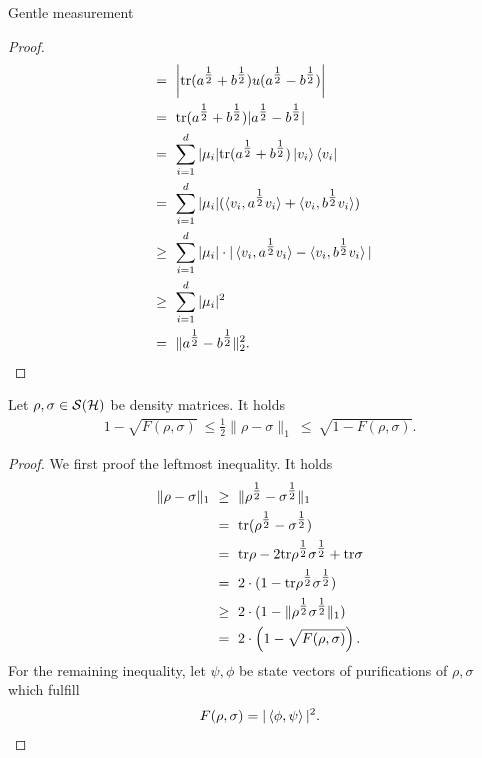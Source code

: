 \begin{subsubsection}{Gentle measurement}
\begin{proof}
\begin{align}
       \ & = \ \left|\mathrm{tr}(a^{\tfrac{1}{2}} + b^{\tfrac{1}{2}})u(a^{\tfrac{1}{2}} - b^{\tfrac{1}{2}}) \right| \\
       \ & = \ \mathrm{tr}(a^{\tfrac{1}{2}} + b^{\tfrac{1}{2}})|a^{\tfrac{1}{2}} - b^{\tfrac{1}{2}}|  \\
       \ & = \ \sum_{i=1}^d |\mu_i| \mathrm{tr} (a^{\tfrac{1}{2}} + b^{\tfrac{1}{2}})\ket{v_i}\bra{v_i} \\
       \ & = \ \sum_{i=1}^d |\mu_i|(\braket{v_i, a^{\tfrac{1}{2}} v_i}  + \braket{v_i, b^{\tfrac{1}{2}} v_i}) \\
       \ & \geq \ \sum_{i=1}^d |\mu_i| \cdot |\braket{v_i, a^{\tfrac{1}{2}} v_i}  - \braket{v_i, b^{\tfrac{1}{2}} v_i}| \\
       \ & \geq \ \sum_{i=1}^d |\mu_i|^2 \\
       \ & = \ \| a^{\tfrac{1}{2}} - b^{\tfrac{1}{2}} \|_2^2.
      \end{align}
      \end{proof}
      \begin{proposition}
       Let $\rho, \sigma \in {\mathcal S}({\mathcal H})$ be density matrices. It holds
       \begin{align}
        1 - \sqrt{F(\rho,\sigma)} \ \leq \frac{1}{2} \|\rho - \sigma\|_1 \ \leq \ \sqrt{1 - F(\rho,\sigma)}.
       \end{align}
      \end{proposition}
      \begin{proof}
       We first proof the leftmost inequality. It holds
       \begin{align}
        \|\rho -\sigma\|_1 
        \ & \geq \ \|\rho^{\tfrac{1}{2}} - \sigma^{\tfrac{1}{2}}\|_1 \\
        \ & = \ \mathrm{tr}(\rho^{\tfrac{1}{2}} - \sigma^{\tfrac{1}{2}}) \\
        \ & = \ \mathrm{tr} \rho - 2 \mathrm{tr} \rho^{\tfrac{1}{2}}\sigma^{\tfrac{1}{2}} + \mathrm{tr} \sigma \\ 
        \ & = \ 2 \cdot (1 - \mathrm{tr} \rho^{\tfrac{1}{2}}\sigma^{\tfrac{1}{2}}) \\
        \ & \geq  \ 2 \cdot (1 - \| \rho^{\tfrac{1}{2}}\sigma^{\tfrac{1}{2}}\|_1) \\ 
        \ & = \  2 \cdot \left(1 - \sqrt{F(\rho, \sigma)}\right).
       \end{align}
       For the remaining inequality, let $\psi, \phi$ be state vectors of purifications of $\rho, \sigma$ which fulfill 
       \begin{align}
        F(\rho,\sigma) = |\braket{\phi,\psi}|^2.
       \end{align}

\end{proof}
\end{subsubsection}
